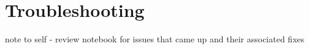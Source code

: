 \section{Troubleshooting}

note to self - review notebook for issues that came up and their associated fixes